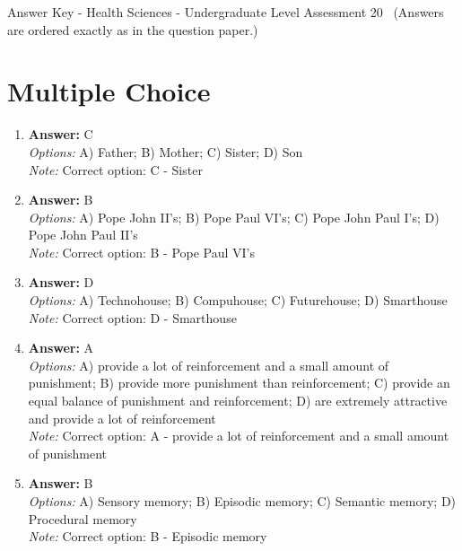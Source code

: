 \documentclass[12pt]{article}
\begin{document}
\begin{center}
Answer Key - Health Sciences - Undergraduate Level Assessment 20 \
\small (Answers are ordered exactly as in the question paper.)
\end{center}

\section*{Multiple Choice}
\begin{enumerate}[label=\arabic*.]
\item \textbf{Answer:} C
\\ \textit{Options:} A) Father; B) Mother; C) Sister; D) Son
\\ \textit{Note:} Correct option: C - Sister
\item \textbf{Answer:} B
\\ \textit{Options:} A) Pope John II's; B) Pope Paul VI's; C) Pope John Paul I's; D) Pope John Paul II's
\\ \textit{Note:} Correct option: B - Pope Paul VI's
\item \textbf{Answer:} D
\\ \textit{Options:} A) Technohouse; B) Compuhouse; C) Futurehouse; D) Smarthouse
\\ \textit{Note:} Correct option: D - Smarthouse
\item \textbf{Answer:} A
\\ \textit{Options:} A) provide a lot of reinforcement and a small amount of punishment; B) provide more punishment than reinforcement; C) provide an equal balance of punishment and reinforcement; D) are extremely attractive and provide a lot of reinforcement
\\ \textit{Note:} Correct option: A - provide a lot of reinforcement and a small amount of punishment
\item \textbf{Answer:} B
\\ \textit{Options:} A) Sensory memory; B) Episodic memory; C) Semantic memory; D) Procedural memory
\\ \textit{Note:} Correct option: B - Episodic memory
\end{enumerate}
\end{document}
